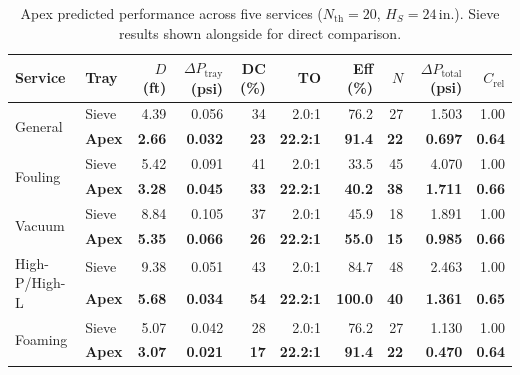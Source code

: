 \documentclass[11pt,letterpaper]{article}
\newcommand{\dpt}{\Delta P_{\mathrm{tray}}}
\newcommand{\dptot}{\Delta P_{\mathrm{total}}}
\begin{document}
\begin{table}[H]
\centering
\caption{Apex predicted performance across five services ($N_{\mathrm{th}}=20$,
  $H_S=24$\,in.).  Sieve results shown alongside for direct comparison.}
\label{tab:services}
\small
\begin{tabular}{llrrrrrrrr}
\toprule
Service & Tray & $D$ (ft) & $\dpt$ (psi) & DC (\%) & TO & Eff (\%)
  & $N$ & $\dptot$ (psi) & $C_{\mathrm{rel}}$\\
\midrule
\multirow{2}{*}{General}
  & Sieve          & 4.39 & 0.056 & 34 & 2.0:1  & 76.2 & 27 & 1.503 & 1.00\\
  & \textbf{Apex}  & \textbf{2.66} & \textbf{0.032} & \textbf{23} & \textbf{22.2:1}
    & \textbf{91.4} & \textbf{22} & \textbf{0.697} & \textbf{0.64}\\
\midrule
\multirow{2}{*}{Fouling}
  & Sieve          & 5.42 & 0.091 & 41 & 2.0:1  & 33.5 & 45 & 4.070 & 1.00\\
  & \textbf{Apex}  & \textbf{3.28} & \textbf{0.045} & \textbf{33} & \textbf{22.2:1}
    & \textbf{40.2} & \textbf{38} & \textbf{1.711} & \textbf{0.66}\\
\midrule
\multirow{2}{*}{Vacuum}
  & Sieve          & 8.84 & 0.105 & 37 & 2.0:1  & 45.9 & 18 & 1.891 & 1.00\\
  & \textbf{Apex}  & \textbf{5.35} & \textbf{0.066} & \textbf{26} & \textbf{22.2:1}
    & \textbf{55.0} & \textbf{15} & \textbf{0.985} & \textbf{0.66}\\
\midrule
\multirow{2}{*}{High-P/High-L}
  & Sieve          & 9.38 & 0.051 & 43 & 2.0:1  & 84.7 & 48 & 2.463 & 1.00\\
  & \textbf{Apex}  & \textbf{5.68} & \textbf{0.034} & \textbf{54} & \textbf{22.2:1}
    & \textbf{100.0} & \textbf{40} & \textbf{1.361} & \textbf{0.65}\\
\midrule
\multirow{2}{*}{Foaming}
  & Sieve          & 5.07 & 0.042 & 28 & 2.0:1  & 76.2 & 27 & 1.130 & 1.00\\
  & \textbf{Apex}  & \textbf{3.07} & \textbf{0.021} & \textbf{17} & \textbf{22.2:1}
    & \textbf{91.4} & \textbf{22} & \textbf{0.470} & \textbf{0.64}\\
\bottomrule
\end{tabular}
\end{table}
\end{document}
